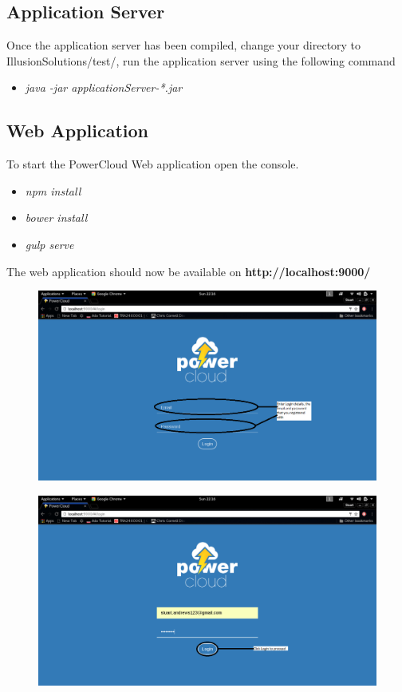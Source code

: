 \documentclass[a4paper,10pt]{article}
\begin{document}
	\subsection{Application Server}
	Once the application server has been compiled, change your directory to IllusionSolutions/test/, run the application server using the following command
	
	\begin{itemize}
		\item \textit{java -jar applicationServer-*.jar}
	\end{itemize}
	
	\subsection{Web Application}
	To start the PowerCloud Web application open the console.
	
	\begin{itemize}
		\item \textit{npm install}
		\item \textit{bower install}
		\item \textit{gulp serve}
	\end{itemize}
	
	The web application should now be available on \textbf{http://localhost:9000/}
	
	\begin{figure}[H]
		\includegraphics[scale=0.3]{images/login.png}
	\end{figure}
	
	\begin{figure}[H]
		\includegraphics[scale=0.3]{images/login2.png}
	\end{figure}
	
\end{document}
